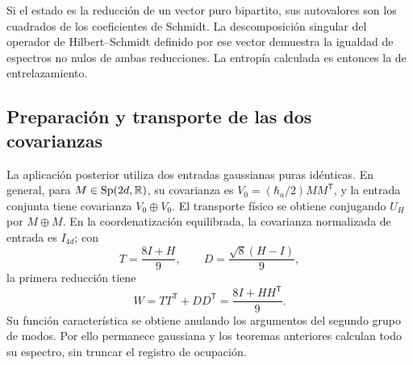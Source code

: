 Si el estado es la reducción de un vector puro bipartito, sus
autovalores son los cuadrados de los coeficientes de Schmidt.
La descomposición singular del operador de Hilbert--Schmidt definido
por ese vector demuestra la igualdad de espectros no nulos de ambas
reducciones. La entropía calculada es entonces la de entrelazamiento.

\subsection{Preparación y transporte de las dos covarianzas}
La aplicación posterior utiliza dos entradas gaussianas puras idénticas.
En general, para \(M\in\operatorname{Sp}(2d,\mathbb R)\), su covarianza es
\(V_0=(\hbar_a/2)MM^{\mathsf T}\), y la entrada conjunta tiene
covarianza \(V_0\oplus V_0\). El transporte físico se obtiene
conjugando \(U_H\) por \(M\oplus M\). En la coordenatización equilibrada,
la covarianza normalizada de entrada es \(I_{4d}\); con
\[
 T=\frac{8I+H}{9},\qquad D=\frac{\sqrt8(H-I)}9,
\]
la primera reducción tiene
\[
 W=TT^{\mathsf T}+DD^{\mathsf T}=\frac{8I+HH^{\mathsf T}}9.
\]
Su función característica se obtiene anulando los argumentos del
segundo grupo de modos. Por ello permanece gaussiana y los teoremas
anteriores calculan todo su espectro, sin truncar el registro de ocupación.
